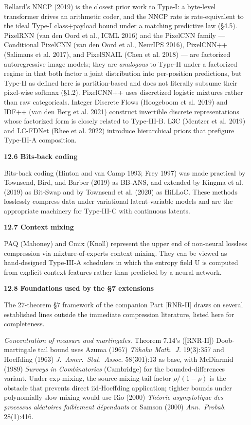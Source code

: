 \documentclass[
]{article}
\begin{document}
Bellard's NNCP (2019) is the closest prior work to Type‑I: a byte‑level
transformer drives an arithmetic coder, and the NNCP rate is
rate-equivalent to the ideal Type-I class+payload bound under a
matching predictive law (§4.5). PixelRNN (van den Oord et al.,
ICML 2016) and the PixelCNN family --- Conditional PixelCNN (van den
Oord et al., NeurIPS 2016), PixelCNN++ (Salimans et al. 2017), and
PixelSNAIL (Chen et al. 2018) --- are factorized autoregressive
image models; they are \emph{analogous} to Type-II under a
factorized regime in that both factor a joint distribution into
per-position predictions, but Type-II as defined here is
partition-based and does not literally subsume their pixel-wise
softmax (§1.2). PixelCNN++ uses discretized logistic mixtures
rather than raw categoricals. Integer Discrete
Flows (Hoogeboom et al. 2019) and IDF++ (van den Berg et al. 2021)
construct invertible discrete representations whose factorized form is
closely related to Type‑III‑B. L3C (Mentzer et al. 2019) and LC-FDNet
(Rhee et al. 2022) introduce hierarchical priors that prefigure
Type‑III‑A composition.

\textbf{12.6 Bits‑back coding}

Bits‑back coding (Hinton and van Camp 1993; Frey 1997) was made
practical by Townsend, Bird, and Barber (2019) as BB‑ANS, and extended
by Kingma et al. (2019) as Bit‑Swap and by Townsend et al. (2020) as
HiLLoC. These methods losslessly compress data under variational
latent‑variable models and are the appropriate machinery for Type‑III‑C
with continuous latents.

\textbf{12.7 Context mixing}

PAQ (Mahoney) and Cmix (Knoll) represent the upper end of non‑neural
lossless compression via mixture‑of‑experts context mixing. They can be
viewed as hand‑designed Type‑III‑A schedulers in which the entropy field
U is computed from explicit context features rather than predicted by a
neural network.

\textbf{12.8 Foundations used by the §7 extensions}

The 27-theorem §7 framework of the companion Part [RNR-II] draws on several established lines outside
the immediate compression literature, listed here for completeness.

\emph{Concentration of measure and martingales.} Theorem 7.14's ([RNR-II])
Doob-martingale tail bound uses Azuma (1967) \emph{T\^ohoku Math.\
J.} 19(3):357 and Hoeffding (1963) \emph{J.\ Amer.\ Stat.\ Assoc.}
58(301):13 as base, with McDiarmid (1989) \emph{Surveys in
Combinatorics} (Cambridge) for the bounded-differences variant.
Under exp-mixing, the source-mixing-tail factor $\rho/(1-\rho)$ is
the obstacle that prevents direct iid-Hoeffding application; tighter
bounds under polynomially-slow mixing would use Rio (2000)
\emph{Th\'eorie asymptotique des processus al\'eatoires faiblement
d\'ependants} or Samson (2000) \emph{Ann.\ Probab.} 28(1):416.
\end{document}
